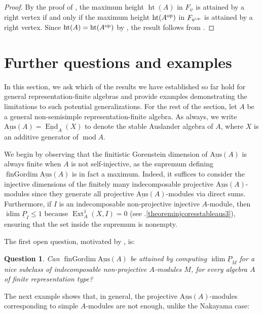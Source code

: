 \documentclass[a4paper]{amsart}
\newtheorem{question}[theorem]{Question}
\theoremstyle{definition}
\theoremstyle{remark}
\numberwithin{equation}{theorem}
\renewcommand{\mod}{\operatorname{mod}}
\newcommand{\Ext}{\operatorname{Ext}}
\newcommand{\End}{\operatorname{End}}
\newcommand{\sAus}{\operatorname{\underline{Aus}}}
\newcommand{\pstab}[1]{\underline{P}_{#1}}
\newcommand{\fingordim}{\operatorname{finGordim}}
\newcommand{\height}{\operatorname{ht}}
\newcommand{\idim}{\operatorname{idim}}
\newcommand{\psiforest}{F_\psi}
\newcommand{\op}{\textnormal{op}}
\newcommand{\psiop}{\psi^{\op}}
\newcommand{\psiopforest}{F_{\psiop}}
\begin{document}
\begin{proof}
    By the proof of , the maximum height $ \height(A) $ in $ \psiforest $ is attained by a right vertex if and only if the maximum height $ \height(A^\op) $ in $ \psiopforest $ is attained by a right vertex. Since $ \height(A) = \height(A^\op) $ by \cite[Corollary~2, Appendix A.1]{Ri2}, the result follows from .
\end{proof}

\section{Further questions and examples}\label{sec:further-questions}

In this section, we ask which of the results we have established so far hold for general representation-finite algebras and provide examples demonstrating the limitations to such potential generalizations.
For the rest of the section, let $A$ be a general non-semisimple representation-finite algebra. As always, we write $\sAus(A) = \underline{\End}_A(X)$ to denote the stable Auslander algebra of $ A $, where $X$ is an additive generator of $\mod A$.

We begin by observing that the finitistic Gorenstein dimension of $ \sAus(A) $ is always finite when $ A $ is not self-injective, as the supremum defining $ \fingordim \sAus(A) $ is in fact a maximum. Indeed, it suffices to consider the injective dimensions of the finitely many indecomposable projective $ \sAus(A) $-modules since
they generate all projective $ \sAus(A) $-modules via direct sums. Furthermore, if $ I $ is an indecomposable non-projective injective $ A $-module, then $ \idim \pstab{I}\leq 1 $ because $\Ext_A^1(X,I)=0$ (see .\eqref{theoreminjcoresstableaus3}), ensuring that the set inside the supremum is nonempty.


The first open question, motivated by , is:

\begin{question}
    Can $ \fingordim \sAus(A) $ be attained by computing $ \idim \pstab M$ for a nice subclass of indecomposable non-projective $A$-modules $ M $, for every algebra $ A $ of finite re\-pre\-sen\-ta\-tion type?
\end{question}

The next example shows that, in general, the projective $ \sAus(A) $-modules corresponding to simple $ A $-modules are not enough, unlike the Nakayama case:
\end{document}
